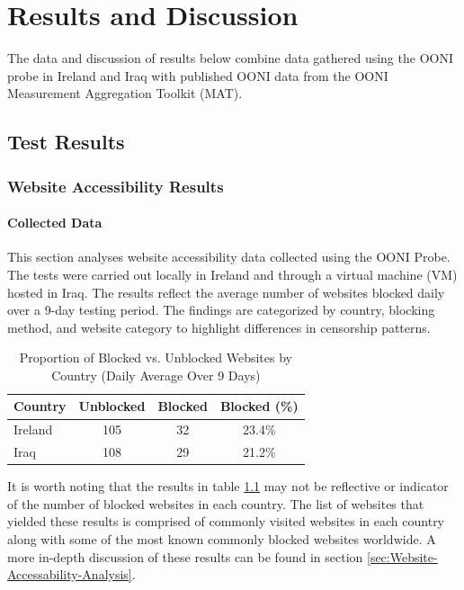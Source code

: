 \chapter{Results and Discussion}

The data and discussion of results below combine data gathered using the OONI probe in Ireland and Iraq with published OONI data from the OONI Measurement Aggregation Toolkit (MAT).

\section{Test Results}

\subsection{Website Accessibility Results}

\subsubsection{Collected Data}

This section analyses website accessibility data collected using the OONI Probe. The tests were carried out locally in Ireland and through a virtual machine (VM) hosted in Iraq. The results reflect the average number of websites blocked daily over a 9-day testing period. The findings are categorized by country, blocking method, and website category to highlight differences in censorship patterns.

\vspace{2em}

\begin{table}[H] 
\centering 
\caption{Proportion of Blocked vs. Unblocked Websites by Country (Daily Average Over 9 Days)} 
\begin{tabular}{lccc} 
\toprule 
\textbf{Country} & \textbf{Unblocked} & \textbf{Blocked} & \textbf{Blocked (\%)} \\
\midrule 
Ireland & 105 & 32 & 23.4\%  \\
Iraq & 108 & 29 & 21.2\% \\
\bottomrule 
\end{tabular} 
\label{tab:blocked_summary} 
\end{table}

It is worth noting that the results in table \ref{tab:blocked_summary} may not be reflective or indicator of the number of blocked websites in each country. The list of websites that yielded these results is comprised of commonly visited websites in each country along with some of the most known commonly blocked websites worldwide. A more in-depth discussion of these results can be found in section \ref{sec:Website-Accessability-Analysis}.

